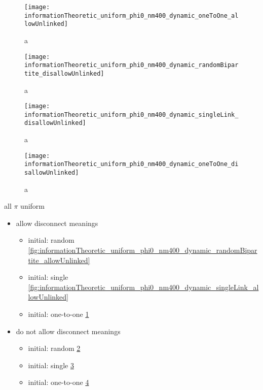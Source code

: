 \begin{figure}
  \centering
  \texttt{[image: informationTheoretic\_uniform\_phi0\_nm400\_dynamic\_oneToOne\_allowUnlinked]}
  \caption{a}
  \label{fig:informationTheoretic_uniform_phi0_nm400_dynamic_oneToOne_allowUnlinked}
\end{figure}

\begin{figure}
  \centering
  \texttt{[image: informationTheoretic\_uniform\_phi0\_nm400\_dynamic\_randomBipartite\_disallowUnlinked]}
  \caption{a}
  \label{fig:informationTheoretic_uniform_phi0_nm400_dynamic_randomBipartite_disallowUnlinked}
\end{figure}

\begin{figure}
  \centering
  \texttt{[image: informationTheoretic\_uniform\_phi0\_nm400\_dynamic\_singleLink\_disallowUnlinked]}
  \caption{a}
  \label{fig:informationTheoretic_uniform_phi0_nm400_dynamic_singleLink_disallowUnlinked}
\end{figure}

\begin{figure}
  \centering
  \texttt{[image: informationTheoretic\_uniform\_phi0\_nm400\_dynamic\_oneToOne\_disallowUnlinked]}
  \caption{a}
  \label{fig:informationTheoretic_uniform_phi0_nm400_dynamic_oneToOne_disallowUnlinked}
\end{figure}

all $\pi$ uniform

\begin{itemize}
\item allow disconnect meanings
  \begin{itemize}
  \item initial: random \ref{fig:informationTheoretic_uniform_phi0_nm400_dynamic_randomBipartite_allowUnlinked}
  \item initial: single \ref{fig:informationTheoretic_uniform_phi0_nm400_dynamic_singleLink_allowUnlinked}
  \item initial: one-to-one \ref{fig:informationTheoretic_uniform_phi0_nm400_dynamic_oneToOne_allowUnlinked}
  \end{itemize}
\item do not allow disconnect meanings
  \begin{itemize}
  \item initial: random \ref{fig:informationTheoretic_uniform_phi0_nm400_dynamic_randomBipartite_disallowUnlinked}
  \item initial: single \ref{fig:informationTheoretic_uniform_phi0_nm400_dynamic_singleLink_disallowUnlinked}
  \item initial: one-to-one \ref{fig:informationTheoretic_uniform_phi0_nm400_dynamic_oneToOne_disallowUnlinked}
  \end{itemize}
\end{itemize}

